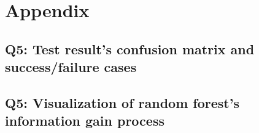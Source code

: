 \section{Appendix}

\subsection{Q5: Test result's confusion matrix and success/failure cases }
\label{subsec:Q5-1}


\subsection{Q5: Visualization of random forest's information gain process}
\label{subsec:Q5-2}
